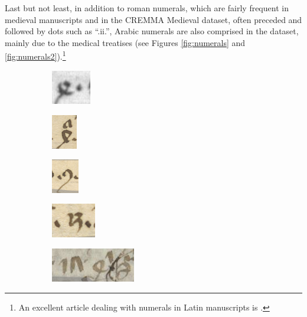 \documentclass{article}
\begin{document}
Last but not least, in addition to roman numerals, which are fairly frequent in medieval manuscripts and in the CREMMA Medieval dataset, often preceded and followed by dots such as \enquote{.ii.}, Arabic numerals are also comprised in the dataset, mainly due to the medical treatises (see Figures \ref{fig:numerals} and  \ref{fig:numerals2}).\footnote{An excellent article dealing with numerals in Latin manuscripts is \cite{charles_numerals}.}
\begin{figure}[H]
    \centering
    \begin{subfigure}{0.20\linewidth}
    \centering
    \includegraphics[height=1.5cm]{datapaper/images/examples/numerals/arabic_4_Latin 16195.png}
    \end{subfigure}
    \begin{subfigure}{0.20\linewidth}
    \centering
    \includegraphics[height=1.5cm]{datapaper/images/examples/numerals/arabic_4_Phi10a135.png}
    \end{subfigure}
     \begin{subfigure}{0.20\linewidth}
    \centering
    \includegraphics[height=1.5cm]{datapaper/images/examples/numerals/arabic_9_Phi10a135.png}
    \end{subfigure}
    \begin{subfigure}{0.20\linewidth}
    \centering
    \includegraphics[height=1.5cm]{datapaper/images/examples/numerals/arabic_numeral_Phi10a135.png}
    \end{subfigure}
    \begin{subfigure}{0.20\linewidth}
    \centering
    \includegraphics[height=1.5cm]{datapaper/images/examples/numerals/arabic_sequence_Sorbonne193.png}

\end{subfigure}
\end{figure}
\end{document}
